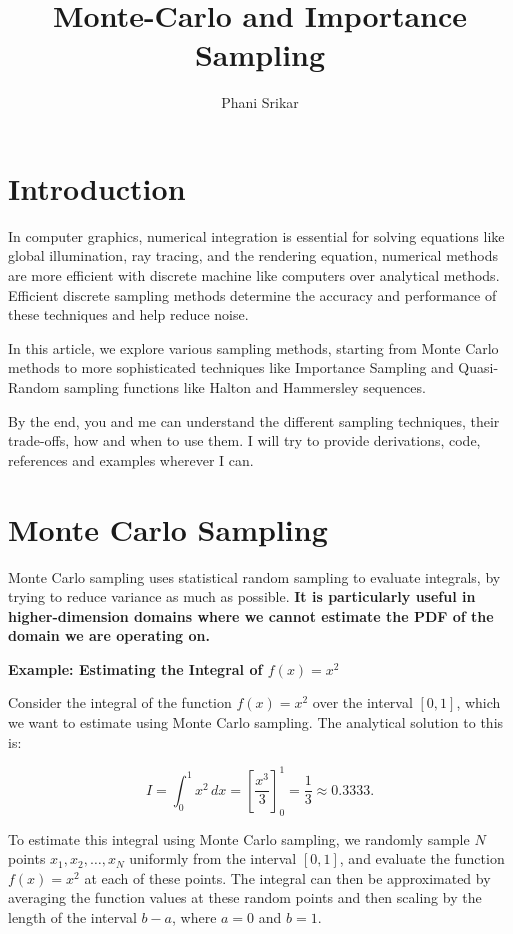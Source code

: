 \documentclass{article}
\title{Monte-Carlo and Importance Sampling}
\author{Phani Srikar}
\begin{document}
\maketitle
\section{Introduction}
	In computer graphics, numerical integration is essential for solving equations like global illumination, ray tracing, and the rendering equation, numerical methods are more efficient with discrete machine like computers over analytical methods. Efficient discrete sampling methods determine the accuracy and performance of these techniques and help reduce noise. 
	
	In this article, we explore various sampling methods, starting from Monte Carlo methods to more sophisticated techniques like Importance Sampling and Quasi-Random sampling functions like Halton and Hammersley sequences. 
	
	By the end, you and me can understand the different sampling techniques, their trade-offs, how and when to use them. I will try to provide derivations, code, references and examples wherever I can.
\section {Monte Carlo Sampling}

	Monte Carlo sampling uses statistical random sampling to evaluate integrals, by trying to reduce variance as much as possible. \textbf{It is particularly useful in higher-dimension domains where we cannot estimate the PDF of the domain we are operating on.}

\textbf{Example: Estimating the Integral of \( f(x) = x^2 \)}

Consider the integral of the function $ f(x) = x^2 $ over the interval $ [0, 1] $, which we want to estimate using Monte Carlo sampling. The analytical solution to this is:

\[
	I = \int_0^1 x^2 \, dx = \left[ \frac{x^3}{3} \right]_0^1 = \frac{1}{3} \approx 0.3333.
\]

	To estimate this integral using Monte Carlo sampling, we randomly sample $N$ points $ x_1, x_2, \dots, x_N $ uniformly from the interval $[0, 1]$, and evaluate the function $f(x) = x^2$ at each of these points. The integral can then be approximated by averaging the function values at these random points and then scaling by the length of the interval $b - a$, where $a = 0$ and $b = 1$.
\end{document}
